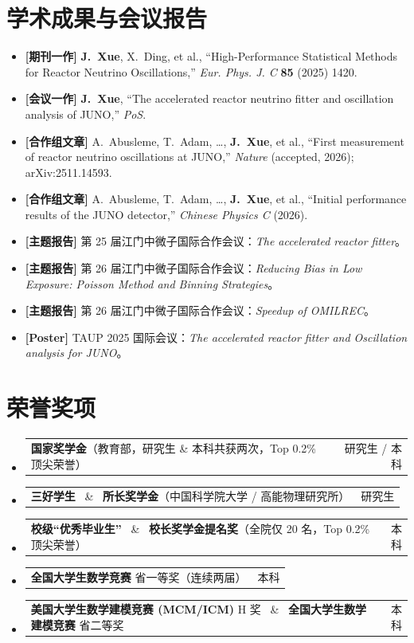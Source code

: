 \documentclass[a4paper,11pt]{article}
\makeatletter
\newcommand{\resumeItem}[1]{
  \item\small{{#1 \vspace{-1pt}}}
}
\newcommand{\resumeProjectHeading}[2]{
    \item
    \begin{tabular*}{0.97\textwidth}{l@{\extracolsep{\fill}}r}
      \small#1 & #2 \\
    \end{tabular*}\vspace{-7pt}
}
\newcommand{\resumeSubHeadingListStart}{\begin{itemize}[leftmargin=0.15in, label={}]}
\newcommand{\resumeSubHeadingListEnd}{\end{itemize}}
\newcommand{\resumeItemListStart}{\begin{itemize}[leftmargin=*, label={\small\textbullet}]}
\newcommand{\resumeItemListEnd}{\end{itemize}\vspace{-2pt}}
\makeatother
\begin{document}
\section{学术成果与会议报告}
  \resumeItemListStart
    \resumeItem{\textbf{[期刊一作]} \textbf{J.~Xue}, X.~Ding, et al., ``High-Performance Statistical Methods for Reactor Neutrino Oscillations,'' \textit{Eur. Phys. J. C} \textbf{85} (2025) 1420.}
    \resumeItem{\textbf{[会议一作]} \textbf{J.~Xue}, ``The accelerated reactor neutrino fitter and oscillation analysis of JUNO,'' \textit{PoS}.}
    \resumeItem{\textbf{[合作组文章]} A.~Abusleme, T.~Adam, \ldots, \textbf{J.~Xue}, et al., ``First measurement of reactor neutrino oscillations at JUNO,'' \textit{Nature} (accepted, 2026); arXiv:2511.14593.}
    \resumeItem{\textbf{[合作组文章]} A.~Abusleme, T.~Adam, \ldots, \textbf{J.~Xue}, et al., ``Initial performance results of the JUNO detector,'' \textit{Chinese Physics C} (2026).}
    \resumeItem{\textbf{[主题报告]} 第 25 届江门中微子国际合作会议：\textit{The accelerated reactor fitter}。}
    \resumeItem{\textbf{[主题报告]} 第 26 届江门中微子国际合作会议：\textit{Reducing Bias in Low Exposure: Poisson Method and Binning Strategies}。}
    \resumeItem{\textbf{[主题报告]} 第 26 届江门中微子国际合作会议：\textit{Speedup of OMILREC}。}
    \resumeItem{\textbf{[Poster]} TAUP 2025 国际会议：\textit{The accelerated reactor fitter and Oscillation analysis for JUNO}。}
  \resumeItemListEnd

\section{荣誉奖项}
  \resumeSubHeadingListStart
    \resumeProjectHeading
      {\textbf{国家奖学金}（教育部，研究生 \& 本科共获两次，Top 0.2\% 顶尖荣誉）}{研究生 / 本科}
    \resumeProjectHeading
      {\textbf{三好学生} \ \& \ \textbf{所长奖学金}（中国科学院大学 / 高能物理研究所）}{研究生}
    \resumeProjectHeading
      {\textbf{校级“优秀毕业生”} \ \& \ \textbf{校长奖学金提名奖}（全院仅 20 名，Top 0.2\% 顶尖荣誉）}{本科}
    \resumeProjectHeading
      {\textbf{全国大学生数学竞赛} 省一等奖（连续两届）}{本科}
    \resumeProjectHeading
      {\textbf{美国大学生数学建模竞赛 (MCM/ICM)} H 奖 \ \& \ \textbf{全国大学生数学建模竞赛} 省二等奖}{本科}
  \resumeSubHeadingListEnd
\end{document}
